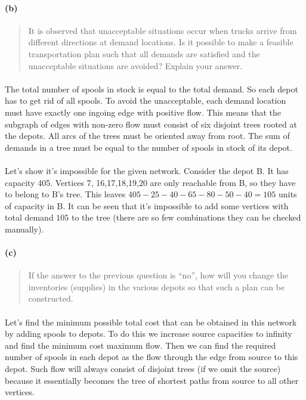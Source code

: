 \paragraph{(b)}
\begin{quote}
It is observed that unacceptable situations occur when trucks arrive from different directions at demand locations. Is it possible to make a feasible transportation plan such that all demands are satisfied and the unacceptable situations are avoided? Explain your answer.
\end{quote}

\paragraph{}
The total number of spools in stock is equal to the total demand. So each depot has to get rid of all spools. To avoid the unacceptable, each demand location must have exactly one ingoing edge with positive flow. This means that the subgraph of edges with non-zero flow must consist of six disjoint trees rooted at the depots. All arcs of the trees must be oriented away from root. The sum of demands in a tree must be equal to the number of spools in stock of its depot.

\paragraph{}
Let's show it's impossible for the given network. Consider the depot B. It has capacity 405. Vertices 7, 16,17,18,19,20 are only reachable from B, so they have to belong to B's tree. This leaves $405-25-40-65-80-50-40=105$ units of capacity in B. It can be seen that it's impossible to add some vertices with total demand $105$ to the tree (there are so few combinations they can be checked manually).

\paragraph{(c)}
\begin{quote}
If the answer to the previous question is ``no'', how will you change the inventories (supplies) in the various depots so that such a plan can be constructed.
\end{quote}

\paragraph{}
Let's find the minimum possible total cost that can be obtained in this network by adding spools to depots. To do this we increase source capacities to infinity and find the minimum cost maximum flow. Then we can find the required number of spools in each depot as the flow through the edge from source to this depot. Such flow will always consist of disjoint trees (if we omit the source) because it essentially becomes the tree of shortest paths from source to all other vertices.

